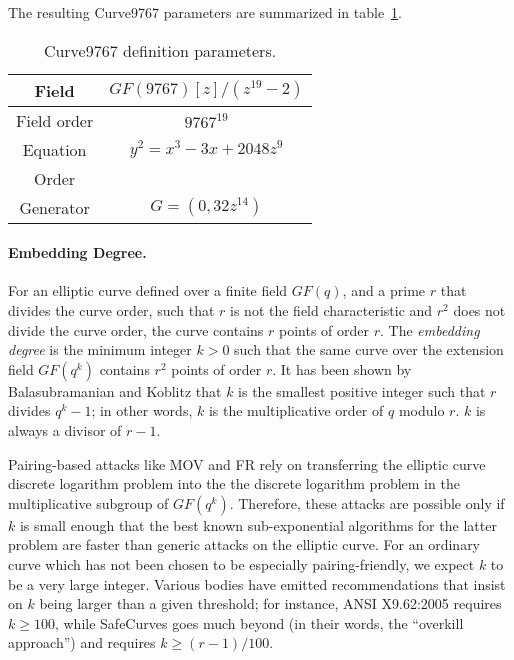 \documentclass{llncs}
\newcommand{\GF}{GF}
\begin{document}
The resulting Curve9767 parameters are summarized in
table~\ref{tab:curveparams}.

\begin{table}[H]
\begin{center}
    \renewcommand{\arraystretch}{1.3}
    \begin{tabular}{|c|c|}
        \hline
        Field & $\GF(9767)[z]/(z^{19}-2)$ \\
        \hline
        Field order & $9767^{19}$ \\
        \hline
        Equation & $y^2 = x^3 - 3x + 2048z^9$ \\
        \hline
        Order & {\fontsize{8.5}{11}\selectfont 6389436622109970582043832278503799542449455630003248488928817956373993578097} \\
        \hline
        Generator & $G = (0, 32z^{14})$ \\
        \hline
    \end{tabular}
\end{center}
\caption{\label{tab:curveparams}Curve9767 definition parameters.}
\end{table}

\paragraph{Embedding Degree.}

For an elliptic curve defined over a finite field $\GF(q)$, and a prime
$r$ that divides the curve order, such that $r$ is not the field
characteristic and $r^2$ does not divide the curve order, the curve
contains $r$ points of order $r$. The \emph{embedding degree} is the
minimum integer $k > 0$ such that the same curve over the extension
field $\GF(q^k)$ contains $r^2$ points of order $r$. It has been shown
by Balasubramanian and Koblitz\cite{BalKob1998} that $k$ is the smallest
positive integer such that $r$ divides $q^k-1$; in other words, $k$ is
the multiplicative order of $q$ modulo $r$. $k$ is always a divisor of
$r-1$.

Pairing-based attacks like MOV\cite{MenOkaVan1993} and
FR\cite{FreRuc1994,FreMulRuc1999} rely on transferring the elliptic
curve discrete logarithm problem into the the discrete logarithm problem
in the multiplicative subgroup of $\GF(q^k)$. Therefore, these attacks
are possible only if $k$ is small enough that the best known
sub-exponential algorithms for the latter problem are faster than
generic attacks on the elliptic curve. For an ordinary curve which has
not been chosen to be especially pairing-friendly, we expect $k$ to be a
very large integer. Various bodies have emitted recommendations that
insist on $k$ being larger than a given threshold; for instance, ANSI
X9.62:2005\cite{X962} requires $k \geq 100$, while
SafeCurves\cite{SafeCurves} goes much beyond (in their words, the
``overkill approach'') and requires $k \geq (r-1)/100$.
\end{document}
